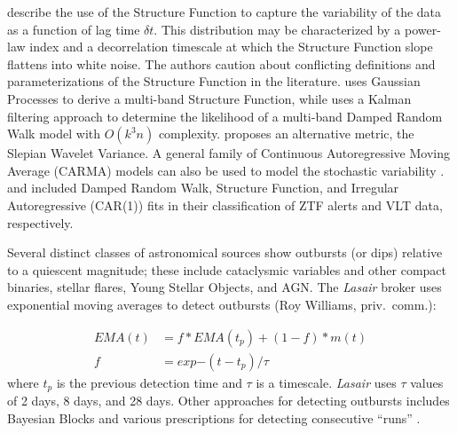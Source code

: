 \documentclass[DM,authoryear,toc]{lsstdoc}
\begin{document}
\citep[and references therein]{Kozowski:16:StructureFunction} describe the use of the Structure Function to capture the variability of the data as a function of lag time $\delta t$.
This distribution may be characterized by a power-law index and a decorrelation timescale at which the Structure Function slope flattens into white noise.
The authors caution about conflicting definitions and parameterizations of the Structure Function in the literature. %
\citep{Hernitschek:16:PS1SF} uses Gaussian Processes to derive a multi-band Structure Function, while \citet{Hu:20:MultibandDRW} uses a Kalman filtering approach to determine the likelihood of a multi-band Damped Random Walk model with $O(k^3n)$ complexity.
\citep{Graham:14:SlepianWavelets} proposes an alternative metric, the Slepian Wavelet Variance.
A general family of Continuous Autoregressive Moving Average (CARMA) models can also be used to model the stochastic variability \citep[and references therein]{Moreno:19:AGNVariabilityHandbook}.
\citet{Sanchez-Saez:21:AlertClassification} and \citet{De-Cicco:21:AGNSelection} included Damped Random Walk, Structure Function, and Irregular Autoregressive (CAR(1)) fits in their classification of ZTF alerts and VLT data, respectively.


Several distinct classes of astronomical sources show outbursts (or dips) relative to a quiescent magnitude; these include cataclysmic variables and other compact binaries, stellar flares, Young Stellar Objects, and AGN.
The \textit{Lasair} broker uses exponential moving averages to detect outbursts (Roy Williams, priv.\ comm.):

\begin{equation}
  \begin{aligned}
    EMA(t) & = f*EMA(t_p) + (1-f)*m(t) \\
    f &= exp{-(t-t_p)/\tau}
  \end{aligned}
\end{equation}
where $t_p$ is the previous detection time and $\tau$ is a timescale.
\textit{Lasair} uses $\tau$ values of  2 days, 8 days, and 28 days.
Other approaches for detecting outbursts includes Bayesian Blocks \citep{Scargle:13:BayesianBlocks} and various prescriptions for detecting consecutive ``runs'' \citep[e.g.,][]{Chang:15:StellarFlares}.
\end{document}
